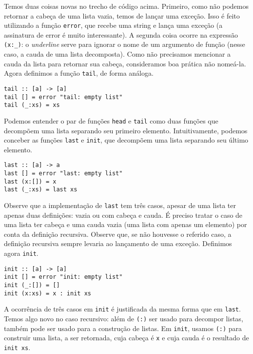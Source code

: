 \documentclass[a4paper]{article}
\begin{document}
Temos duas coisas novas no trecho de código acima.
Primeiro, como não podemos retornar a cabeça de uma lista vazia, temos de lançar uma exceção.
Isso é feito utilizando a função \texttt{error}, que recebe uma string e lança uma exceção (a assinatura de error é muito interessante).
A segunda coisa ocorre na expressão \texttt{(x:\_)}: o \emph{underline} serve para ignorar o nome de um argumento de função (nesse caso, a cauda de uma lista decomposta).
Como não precisamos mencionar a cauda da lista para retornar sua cabeça, consideramos boa prática não nomeá-la.
Agora definimos a função \texttt{tail}, de forma análoga.

\begin{verbatim}
tail :: [a] -> [a]
tail [] = error "tail: empty list"
tail (_:xs) = xs
\end{verbatim}

Podemos entender o par de funções \texttt{head} e \texttt{tail} como duas funções que decompõem uma lista separando seu primeiro elemento.
Intuitivamente, podemos conceber as funções \texttt{last} e \texttt{init}, que decompõem uma lista separando seu último elemento.

\begin{verbatim}
last :: [a] -> a
last [] = error "last: empty list"
last (x:[]) = x
last (_:xs) = last xs
\end{verbatim}

Observe que a implementação de \texttt{last} tem três casos, apesar de uma lista ter apenas duas definições: vazia ou com cabeça e cauda.
É preciso tratar o caso de uma lista ter cabeça e uma cauda vazia (uma lista com apenas um elemento) por conta da definição recursiva.
Observe que, se não houvesse o referido caso, a definição recursiva sempre levaria ao lançamento de uma exceção.
Definimos agora \texttt{init}.

\begin{verbatim}
init :: [a] -> [a]
init [] = error "init: empty list"
init (_:[]) = []
init (x:xs) = x : init xs
\end{verbatim}

A ocorrência de três casos em \texttt{init} é justificada da mesma forma que em \texttt{last}.
Temos algo novo no caso recursivo: além de \texttt{(:)} ser usado para decompor listas, também pode ser usado para a construção de listas.
Em \texttt{init}, usamos \texttt{(:)} para construir uma lista, a ser retornada, cuja cabeça é \texttt{x} e cuja cauda é o resultado de \texttt{init xs}.
\end{document}
